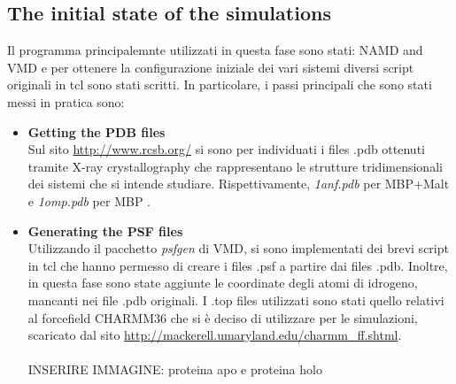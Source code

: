 \subsection{The initial state of the simulations}
Il programma principalemnte utilizzati in questa fase sono stati: NAMD \cite{ref:NAMD} and VMD \cite{humphrey1996vmd} e per ottenere la configurazione iniziale dei vari sistemi diversi script originali in tcl sono stati scritti. In particolare, i passi principali che sono stati messi in pratica sono:
\begin{itemize}
\item \textbf{Getting the PDB files}\\
Sul sito \url{http://www.rcsb.org/} si sono per individuati i files .pdb ottenuti tramite X-ray crystallography che rappresentano le strutture tridimensionali dei sistemi che si intende studiare. Rispettivamente, \textit{1anf.pdb} per MBP+Malt \cite{quiocho1997extensive} e \textit{1omp.pdb} per MBP \cite{sharff1992crystallographic}.

\item \textbf{Generating the PSF files}\\
Utilizzando il pacchetto \textit{psfgen} di VMD, si sono implementati dei brevi script in tcl che hanno permesso di creare i files .psf a partire dai files .pdb. Inoltre, in questa fase sono state aggiunte le coordinate degli atomi di idrogeno, mancanti nei file .pdb originali. I .top files utilizzati sono stati quello relativi al forcefield CHARMM36 che si è deciso di utilizzare per le simulazioni, scaricato dal sito \url{http://mackerell.umaryland.edu/charmm_ff.shtml}. \\
\\
INSERIRE IMMAGINE: proteina apo e proteina holo\\


\end{itemize}
